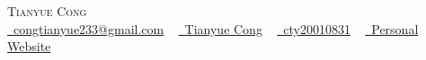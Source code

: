 \documentclass{resume} %
\begin{document}

\begin{center}
    {\Huge \scshape{Tianyue Cong}} \\ \vspace{9pt}
    \small
    \href{congtianyue233@gmail.com}{\faEnvelope\ congtianyue233@gmail.com} ~ 
    \href{https://www.linkedin.com/in/tianyue-cong-94969921b/}{\faLinkedin\ Tianyue Cong}  ~
    \href{https://github.com/cty20010831}{\faGithub\ cty20010831} ~
    \href{https://cty20010831.github.io/personal_site}{\faGlobe\ Personal Website}
    \vspace{-5pt}
\end{center}

\end{document}
